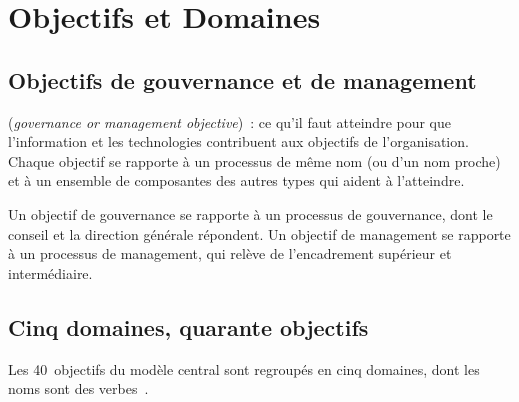\section{Objectifs et Domaines}
\label{sec:c05-domaines}

\subsection{Objectifs de gouvernance et de management}

\begin{boxdef}
 (\textit{governance or
management objective})~: ce qu'il faut atteindre pour que l'information
et les technologies contribuent aux objectifs de l'organisation. Chaque
objectif se rapporte à un processus de même nom (ou d'un nom proche) et à
un ensemble de composantes des autres types qui aident à l'atteindre.
\end{boxdef}

Un objectif de gouvernance se rapporte à un processus de gouvernance, dont
le conseil et la direction générale répondent. Un objectif de management
se rapporte à un processus de management, qui relève de l'encadrement
supérieur et intermédiaire.

\subsection{Cinq domaines, quarante objectifs}

Les 40~objectifs du modèle central sont regroupés en cinq domaines, dont
les noms sont des verbes~\cite{isaca2018cobitintro}.

